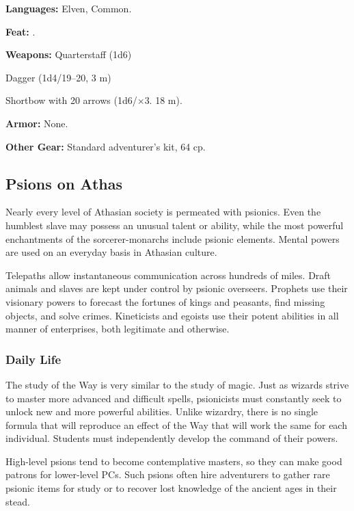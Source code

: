 \textbf{Languages:} Elven, Common.

\textbf{Feat:} .

\textbf{Weapons:} Quarterstaff (1d6)

Dagger (1d4/19--20, 3 m)

Shortbow with 20 arrows (1d6/$\times$3. 18 m).

\textbf{Armor:} None.

\textbf{Other Gear:} Standard adventurer's kit, 64 cp.

\subsection{Psions on Athas}

Nearly every level of Athasian society is permeated with psionics. Even the humblest slave may possess an unusual talent or ability, while the most powerful enchantments of the sorcerer-monarchs include psionic elements. Mental powers are used on an everyday basis in Athasian culture.

Telepaths allow instantaneous communication across hundreds of miles. Draft animals and slaves are kept under control by psionic overseers. Prophets use their visionary powers to forecast the fortunes of kings and peasants, find missing objects, and solve crimes. Kineticists and egoists use their potent abilities in all manner of enterprises, both legitimate and otherwise.

\subsubsection{Daily Life}
The study of the Way is very similar to the study of magic. Just as wizards strive to master more advanced and difficult spells, psionicists must constantly seek to unlock new and more powerful abilities. Unlike wizardry, there is no single formula that will reproduce an effect of the Way that will work the same for each individual. Students must independently develop the command of their powers.

High-level psions tend to become contemplative masters, so they can make good patrons for lower-level PCs. Such psions often hire adventurers to gather rare psionic items for study or to recover lost knowledge of the ancient ages in their stead.

